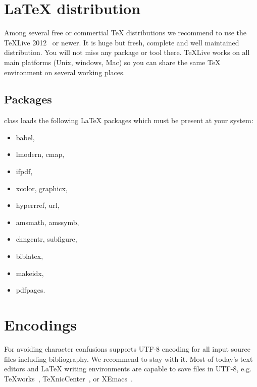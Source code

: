 \section{\LaTeX{} distribution}
Among several free or commertial \TeX{} distributions we
recommend to use the \TeX{}Live 2012~\cite{TeXLive} or newer. It is huge but
fresh, complete and well maintained distribution. You will not miss
any package or tool there. \TeX{}Live works on all main platforms
(Unix, windows, Mac) so you can share the same \TeX{} environment
on several working places.

\subsection{Packages}
\label{sec:dependency}
\FelThesis{} class loads the following \LaTeX{} packages
which must be present at your system:
\begin{itemize}
\item babel,
\item lmodern, cmap,
\item ifpdf,
\item xcolor, graphicx,
\item hyperrref, url,
\item amsmath, amssymb,
\item chngcntr, subfigure,
\item biblatex,
\item makeidx,
\item pdfpages. 
\end{itemize}

\section{Encodings}
For avoiding character confusions \FelThesis{} supports UTF-8 encoding
for all input source files including bibliography. We recommend to
stay with it. Most of today's text editors
and \LaTeX{} writing environments are capable to save files in UTF-8,
e.g. \TeX{}works~\cite{texworks}, \TeX{}nicCenter~\cite{texniccenter}, or 
XEmacs~\cite{xemacs}.

\endinput

